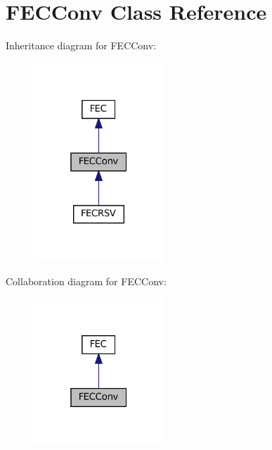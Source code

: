 \hypertarget{classFECConv}{}\section{F\+E\+C\+Conv Class Reference}
\label{classFECConv}


Inheritance diagram for F\+E\+C\+Conv\+:
\nopagebreak
\begin{figure}[H]
\begin{center}
\leavevmode
\includegraphics[width=139pt]{classFECConv__inherit__graph}
\end{center}
\end{figure}


Collaboration diagram for F\+E\+C\+Conv\+:
\nopagebreak
\begin{figure}[H]
\begin{center}
\leavevmode
\includegraphics[width=139pt]{classFECConv__coll__graph}
\end{center}
\end{figure}
